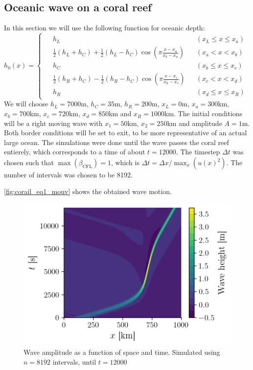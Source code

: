 
\subsection{Oceanic wave on a coral reef}

In this section we will use the following function for oceanic depth:
\begin{equation}
    h_0(x) = \begin{cases}
        \begin{aligned}
            &\scriptstyle{h_L} &&\scriptstyle{(x_L \le x \le x_a)} \\
            &\scriptstyle{\frac{1}{2}(h_L + h_C) + \frac{1}{2}(h_L - h_C) \cos \left( \pi \frac{x-x_a}{x_b-x_a} \right)} &&\scriptstyle{(x_a < x < x_b)} \\
            &\scriptstyle{h_C} &&\scriptstyle{(x_b \le x \le x_c)} \\
            &\scriptstyle{\frac{1}{2}(h_R + h_C) - \frac{1}{2}(h_R - h_C) \cos \left( \pi \frac{x-x_c}{x_d-x_c} \right)} &&\scriptstyle{(x_c < x < x_d)} \\
            &\scriptstyle{h_R} &&\scriptstyle{(x_d \le x \le x_R)}
        \end{aligned}
    \end{cases}
\end{equation}
We will choose \(h_L = 7000\)m, \(h_C = 35\)m, \(h_R = 200\)m, \(x_L = 0\)m, \(x_a = 300\)km, \(x_b = 700\)km, \(x_c = 720\)km, \(x_d = 850\)km and \(x_R = 1000\)km. The initial conditions will be a right moving wave with \(x_1 = 50\)km, \(x_2 = 250\)km and amplitude \(A = 1\)m. Both border conditions will be set to exit, to be more representative of an actual large ocean. The simulations were done until the wave passes the coral reef entierely, which corresponds to a time of about \(t = 12000\). The timestep \(\Delta t\) was chosen such that \(\max(\beta_{\textrm{CFL}}) = 1\), which is \(\Delta t = \Delta x / \max_x(u(x)^2)\). The number of intervals was chosen to be 8192.

\autoref{fig:corail_eq1_mouv} shows the obtained wave motion.

\begin{figure}[h]
    \centering
    \includegraphics[width=0.6\linewidth]{figures/corail_eq1_mouvement_vague.png}
    \caption{Wave amplitude as a function of space and time. Simulated using \(n=8192\) intervals, until \(t=12000\)}
    \label{fig:corail_eq1_mouv}
\end{figure}